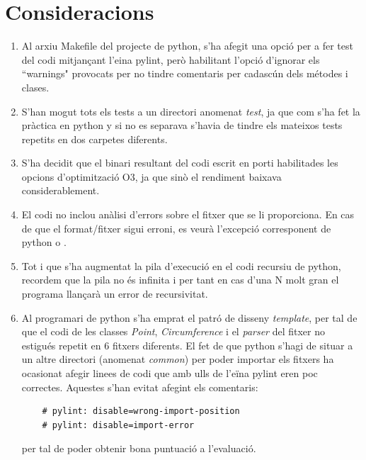 \documentclass[12pt, letterpaper]{article}
\begin{document}
\section{Consideracions}
\begin{enumerate}
\item Al arxiu Makefile del projecte de python, s'ha afegit una opció per a fer test del codi mitjançant l'eina pylint, però habilitant l'opció d'ignorar els ``warnings" provocats per no tindre
    comentaris per cadascún dels métodes i clases.
\item S'han mogut tots els tests a un directori anomenat \textit{test}, ja que com s'ha fet la pràctica en python y \cpluspluslogo  si no es separava s'havia de tindre els mateixos tests repetits en dos carpetes diferents.
\item S'ha decidit que el binari resultant del codi escrit en \cpluspluslogo porti habilitades les opcions d'optimització O3, ja que sinò el rendiment baixava considerablement.
\item El codi no inclou anàlisi d'errors sobre el fitxer que se li proporciona. En cas de que el format/fitxer sigui erroni, es veurà l'excepció corresponent 
    de python o \cpluspluslogo.
\item Tot i que s'ha augmentat la pila d'execució en el codi recursiu de python, recordem que la pila no és infinita i per tant en cas d'una N molt gran el programa llançarà un error de recursivitat.
\item Al programari de python s'ha emprat el patró de disseny \textit{template}, per tal de que el codi de les classes \textit{Point}, \textit{Circumference} i el \textit{parser} del fitxer no estigués repetit en 6 fitxers diferents. El fet de que python s'hagi de situar a un altre directori (anomenat \textit{common}) per poder importar els fitxers ha ocasionat afegir linees de codi que amb ulls de l'eïna pylint eren poc correctes. Aquestes s'han evitat afegint els comentaris:
    \begin{verbatim}
    # pylint: disable=wrong-import-position
    # pylint: disable=import-error
    \end{verbatim}
    per tal de poder obtenir bona puntuació a l'evaluació.
\end{enumerate}
\end{document}
